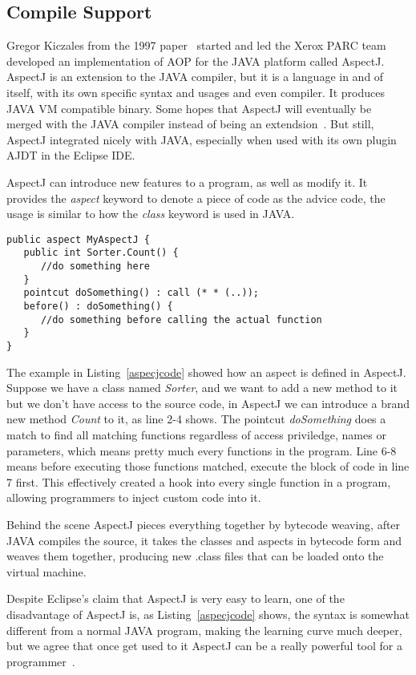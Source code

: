 \subsection{Compile Support}

Gregor Kiczales from the 1997 paper~\cite{aop} started and led the Xerox PARC team developed an implementation of AOP for the JAVA platform called AspectJ. AspectJ is an extension to the JAVA compiler, but it is a language in and of itself, with its own specific syntax and usages and even compiler. It produces JAVA VM compatible binary. Some hopes that AspectJ will eventually be merged with the JAVA compiler instead of being an extendsion~\cite{aspectj_faq}. But still, AspectJ integrated nicely with JAVA, especially when used with its own plugin AJDT in the Eclipse IDE.

AspectJ can introduce new features to a program, as well as modify it. It provides the {\em aspect} keyword to denote a piece of code as the advice code, the usage is similar to how the {\em class} keyword is used in JAVA.

\begin{lstlisting}[caption={sample aspectj code}, label=aspecjcode]
public aspect MyAspectJ {
   public int Sorter.Count() {
      //do something here
   }
   pointcut doSomething() : call (* * (..));
   before() : doSomething() {
      //do something before calling the actual function
   }
}
\end{lstlisting}

The example in Listing~\ref{aspecjcode} showed how an aspect is defined in AspectJ. Suppose we have a class named {\em Sorter}, and we want to add a new method to it but we don't have access to the source code, in AspectJ we can introduce a brand new method {\em Count} to it, as line 2-4 shows. The pointcut {\em doSomething} does a match to find all matching functions regardless of access priviledge, names or parameters, which means pretty much every functions in the program. Line 6-8 means before executing those functions matched, execute the block of code in line 7 first. This effectively created a hook into every single function in a program, allowing programmers to inject custom code into it.

Behind the scene AspectJ pieces everything together by bytecode weaving, after JAVA compiles the source, it takes the classes and aspects in bytecode form and weaves them together, producing new .class files that can be loaded onto the virtual machine.

Despite Eclipse's claim that AspectJ is very easy to learn, one of the disadvantage of AspectJ is, as Listing~\ref{aspecjcode} shows, the syntax is somewhat different from a normal JAVA program, making the learning curve much deeper, but we agree that once get used to it AspectJ can be a really powerful tool for a programmer~\cite{aspectj_text}.

